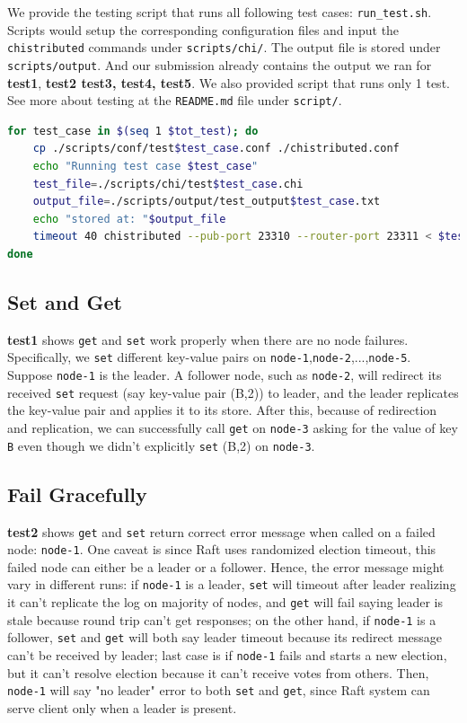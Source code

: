 \documentclass[11pt]{article}
\begin{document}
We provide the testing script that runs all following test cases: \texttt{run\_test.sh}. Scripts would setup the corresponding configuration files and input the \texttt{chistributed} commands under \texttt{scripts/chi/}. The output file is stored under \texttt{scripts/output}. And our submission already contains the output we ran for {\bf{test1}}, {\bf{test2} \bf{test3}, test4, test5}. We also provided script that runs only 1 test. See more about testing at the \texttt{README.md} file under \texttt{script/}. 

\begin{lstlisting}[language=bash]
for test_case in $(seq 1 $tot_test); do
    cp ./scripts/conf/test$test_case.conf ./chistributed.conf
    echo "Running test case $test_case"
    test_file=./scripts/chi/test$test_case.chi
    output_file=./scripts/output/test_output$test_case.txt
    echo "stored at: "$output_file
    timeout 40 chistributed --pub-port 23310 --router-port 23311 < $test_file > $output_file
done
\end{lstlisting}

\subsection{Set and Get}

{\bf test1} shows \texttt{get}  and \texttt{set} work properly when there are no node failures. Specifically, we \texttt{set} different key-value pairs on \texttt{node-1},\texttt{node-2},...,\texttt{node-5}. Suppose \texttt{node-1} is the leader. A follower node, such as \texttt{node-2}, will redirect its received \texttt{set} request (say key-value pair (B,2)) to leader, and the leader replicates the key-value pair and applies it to its store. After this, because of redirection and replication, we can successfully call \texttt{get} on \texttt{node-3}  asking for the value of key \texttt{B} even though we didn't explicitly \texttt{set} (B,2) on  \texttt{node-3}.


\subsection{Fail Gracefully}
{\bf test2} shows \texttt{get} and \texttt{set} return correct error message when called on a failed node: \texttt{node-1}. One caveat is since Raft uses randomized election timeout, this failed node can either be a leader or a follower. Hence, the error message might vary in different runs: if \texttt{node-1} is a leader, \texttt{set} will timeout after leader realizing it can't replicate the log on majority of nodes, and \texttt{get} will fail saying leader is stale because round trip can't get responses; on the other hand, if \texttt{node-1} is a follower, \texttt{set} and \texttt{get} will both say leader timeout because its redirect message can't be received by leader; last case is if \texttt{node-1} fails and starts a new election, but it can't resolve election because it can't receive votes from others. Then, \texttt{node-1} will say "no leader" error to both \texttt{set} and \texttt{get}, since Raft system can serve client only when a leader is present. 
\end{document}
